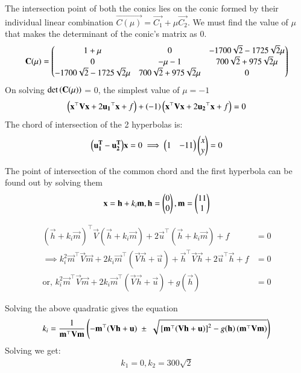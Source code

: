 \documentclass[journal]{IEEEtran}
\begin{document}
The intersection point of both the conics lies on the conic formed by their individual linear combination $\vec{C(\mu)} = \vec{C_1} + \mu\vec{C_2}$. We must find the value of $\mu$ that makes the determinant of the conic's matrix as 0.
\begin{align}
\mathbf{C(\mu)} = \begin{pmatrix}1+\mu & 0 & -1700\sqrt{2} -1725\sqrt{2}\mu \\ 0 & -\mu - 1 & 700\sqrt{2}+  975\sqrt{2}\mu \\ -1700\sqrt{2} -1725\sqrt{2}\mu & 700\sqrt{2}+ 975\sqrt{2}\mu & 0\end{pmatrix}
\end{align}
On solving $\det{\ensuremath{\left(\mathbf{C(\mu)}\right)}}$ = 0, the simplest value of $\mu = -1$
\begin{align}
\left(\mathbf{x}^\top\mathbf{V}\mathbf{x} + 2\mathbf{u_1}^\top\mathbf{x} + f\right) + \left(-1\right)\left(\mathbf{x}^\top\mathbf{V}\mathbf{x} + 2\mathbf{u_2}^\top\mathbf{x} + f\right) = 0
\end{align}
The chord of intersection of the 2 hyperbolas is:
\begin{align}
\mathbf{\left(u_1^T - u_2^T\right)}\mathbf{x} = 0 \implies \begin{pmatrix}1 & -11\end{pmatrix}\begin{pmatrix}x \\ y\end{pmatrix} = 0
\end{align}

The point of intersection of the common chord and the first hyperbola can be found out by solving them
\begin{align}
\mathbf{x} = \mathbf{h} + k_i\mathbf{m}, \mathbf{h} = \begin{pmatrix}0 \\ 0\end{pmatrix}, \mathbf{m} = \begin{pmatrix}11 \\ 1\end{pmatrix}
\end{align}

\begin{align}
(\vec{h} + k_i \vec{m})^{\top} \vec{V} (\vec{h} + k_i \vec{m}) + 2\vec{u}^{\top} (\vec{h} + k_i \vec{m}) + f &= 0 \\
\implies k_i^{2} \vec{m}^{\top}\vec{V}\vec{m} + 2k_i \vec{m}^{\top} (\vec{V}\vec{h} + \vec{u}) + \vec{h}^{\top}\vec{V}\vec{h} + 2\vec{u}^{\top}\vec{h} + f &= 0 \\
\text{or, } k_i^{2} \vec{m}^{\top}\vec{V}\vec{m} + 2k_i \vec{m}^{\top} (\vec{V}\vec{h} + \vec{u}) + g(\vec{h}) &= 0
\end{align}

Solving the above quadratic gives the equation
\begin{align}
k_i = \frac{1}{\mathbf{m}^{\top}\mathbf{V}\mathbf{m}}
\left(
    -\mathbf{m}^{\top} (\mathbf{V}\mathbf{h} + \mathbf{u})
    \;\pm\;
    \sqrt{ {}\left[\mathbf{m}^{\top}(\mathbf{V}\mathbf{h} + \mathbf{u})\right]^2
    - g(\mathbf{h}) \, (\mathbf{m}^{\top}\mathbf{V}\mathbf{m}) }
    \right)
\end{align}
Solving we get:
\begin{align}
k_1 = 0, k_2 = 300\sqrt{2}
\end{align}
\end{document}
